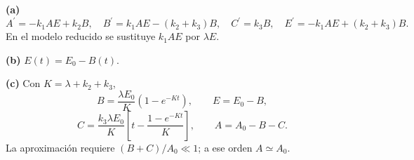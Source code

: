 \noindent\textbf{(a)} \[A^{\prime}=-k_1AE+k_2B,\quad B^{\prime}=k_1AE-(k_2+k_3)B,\quad C^{\prime}=k_3B,\quad E^{\prime}=-k_1AE+(k_2+k_3)B.\]En el modelo reducido se sustituye $k_1AE$ por $\lambda E$.

\noindent\textbf{(b)} $E(t)=E_0-B(t)$.

\noindent\textbf{(c)} Con $K=\lambda+k_2+k_3$,\[B=\frac{\lambda E_0}{K}(1-e^{-Kt}),\qquad E=E_0-B,\]\[C=\frac{k_3\lambda E_0}{K}\left[t-\frac{1-e^{-Kt}}K\right],\qquad A=A_0-B-C.\]La aproximación requiere $(B+C)/A_0\ll1$; a ese orden $A\simeq A_0$.
